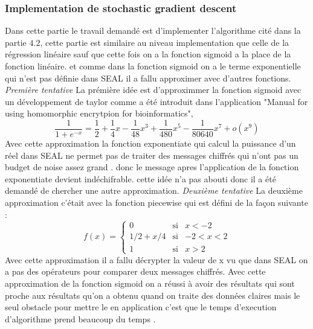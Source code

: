 \documentclass[a4paper,12pt]{article}
\begin{document}
  \subsubsection{Implementation de stochastic gradient descent}
  Dans cette partie le travail demandé est d'implementer l'algorithme cité dans la partie $4.2$, cette partie est similaire au niveau implementation que celle de la régression linéaire sauf que cette fois on a la fonction sigmoid a la place de la fonction linéaire.
  et comme dans la fonction sigmoid on a le terme exponentielle qui n'est pas définie dans SEAL il a fallu approximer avec d'autres fonctions.\newline
  \textit{Première tentative}\newline
  La prémière idée est d'approximmer la fonction sigmoid avec un développement de taylor comme a été introduit dans l'application "Manual for using homomorphic encrytpion for bioinformatics",\newline    
  \newcommand\omicron{o}
  $$\dfrac{1}{1+e^{-x}} = \dfrac{1}{2} + \dfrac{1}{4}x - \dfrac{1}{48}x^3 + \dfrac{1}{480}x^5 - \dfrac{1}{80640}x^7 + \omicron(x^9)$$
  Avec cette approximation la fonction exponentiate qui calcul la puissance d'un réel dans SEAL ne permet pas de traiter des messages chiffrés qui n'ont pas un budget de noise assez grand . donc le message apres l'application de la fonction exponentiate devient indéchifrable.\newline
  cette idée n'a pas abouti donc il a été demandé de chercher une autre approximation.\newline  
  \textit{Deuxième tentative}\newline  
  La deuxième approximation c'était avec la fonction piecewise qui est défini de la façon suivante :\newline
  \begin{equation}
f(x)=
\left\lbrace
\begin{array}{ccc}
0  & \mbox{si} & x<-2\\
1/2 + x/4 & \mbox{si} & -2<x<2\\
1 & \mbox{si} & x>2
\end{array}\right.
\end{equation} 
Avec cette approximation il a fallu décrypter la valeur de x vu que dans SEAL on a pas des opérateurs pour comparer deux messages chiffrés.\newline 
Avec cette approximation de la fonction sigmoid on a réussi à avoir des résultats qui sont proche aux résultats qu'on a obtenu quand on traite des données claires  mais le seul obstacle pour mettre le en application c'est que le temps d'execution d'algorithme prend beaucoup du temps . 
\end{document}
